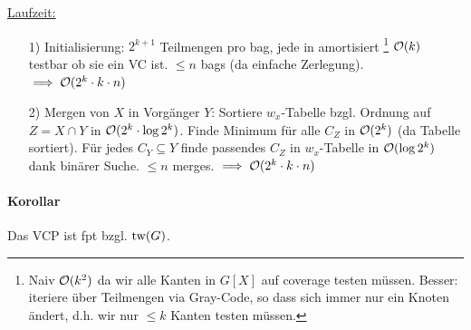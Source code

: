 \underline{Laufzeit:}
\begin{itemize}
    \item[1)] Initialisierung: $2^{k+1}$ Teilmengen pro bag, jede in amortisiert%
    \footnote{Naiv $\mathcal{O} (k^2)$ da wir alle Kanten in $G[X]$ auf coverage testen müssen.
    Besser: iteriere über Teilmengen via Gray-Code, so dass sich immer nur ein Knoten ändert,
    d.h. wir nur $\leq k$ Kanten testen müssen.}
    $\mathcal{O} (k)$ testbar ob sie ein VC ist.
    $\leq n$ bags (da einfache Zerlegung).
    $\implies \mathcal{O} (2^k \cdot k \cdot n)$
    \item[2)] Mergen von $X$ in Vorgänger $Y$:
    Sortiere $w_x$-Tabelle bzgl. Ordnung auf $Z=X \cap Y$ in $\mathcal{O} (2^k \cdot \log 2^k)$.
    Finde Minimum für alle $C_Z$ in $\mathcal{O}(2^k)$ (da Tabelle sortiert).
    Für jedes $C_Y \subseteq Y$ finde passendes $C_Z$ in $w_x$-Tabelle in $\mathcal{O}(\log 2^k)$ dank binärer Suche.
    $\leq n$ merges.
    $\implies \mathcal{O} (2^k \cdot k \cdot n)$
\end{itemize}

\paragraph{Korollar}
Das VCP ist fpt bzgl. $\text{tw}(G)$.



